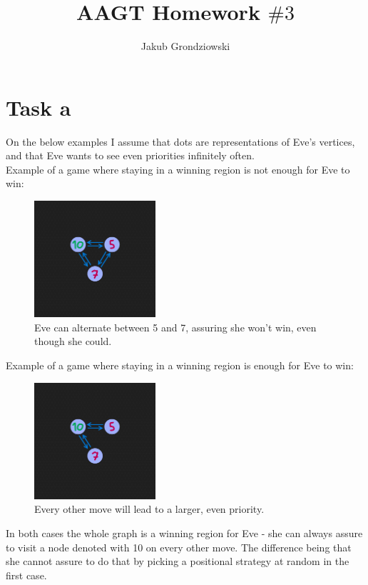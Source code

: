 \documentclass{article}
\title{AAGT Homework $\#3$}
\author{Jakub Grondziowski}
\date{}
\begin{document}
\maketitle

\section{Task a}
On the below examples I assume that dots are representations of Eve's vertices, and that Eve wants to see even priorities infinitely often. \\

Example of a game where staying in a winning region is not enough for Eve to win:
\begin{figure}[h]
\centering
\includegraphics[width=0.4\textwidth]{bad.png}
\caption{\label{fig:counter}Eve can alternate between 5 and 7, assuring she won't win, even though she could.}
\end{figure}

Example of a game where staying in a winning region is enough for Eve to win:
\begin{figure}[h]
\centering
\includegraphics[width=0.4\textwidth]{good.png}
\caption{\label{fig:counter}Every other move will lead to a larger, even priority.}
\end{figure}

In both cases the whole graph is a winning region for Eve - she can always assure to visit a node denoted with 10 on every other move. The difference being that she cannot assure to do that by picking a positional strategy at random in the first case.
\end{document}
